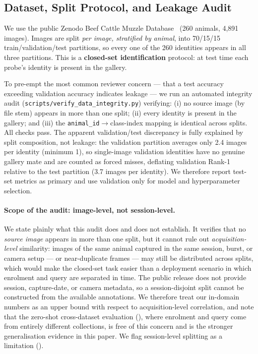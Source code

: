 \documentclass[11pt]{article}
\begin{document}
\subsection{Dataset, Split Protocol, and Leakage Audit}\label{sec:data}
We use the public Zenodo Beef Cattle Muzzle Database~\cite{zenodo} (260 animals, 4{,}891 images). Images
are split \emph{per image, stratified by animal}, into 70/15/15 train/validation/test
partitions, so every one of the 260 identities appears in all three partitions. This is a
\textbf{closed-set identification} protocol: at test time each probe's identity is present
in the gallery.

To pre-empt the most common reviewer concern --- that a test accuracy exceeding validation
accuracy indicates leakage --- we run an automated integrity audit
(\texttt{scripts/\allowbreak verify\_data\_integrity.py}) verifying: (i) no source image (by file stem)
appears in more than one split; (ii) every identity is present in the gallery; and (iii)
the \texttt{animal\_id}$\to$class-index mapping is identical across splits. All checks pass.
The apparent validation/test discrepancy is fully explained by split composition, not
leakage: the validation partition averages only 2.4 images per identity (minimum 1), so
single-image validation identities have no genuine gallery mate and are counted as forced
misses, deflating validation Rank-1 relative to the test partition (3.7 images per
identity). We therefore report test-set metrics as primary and use validation only for
model and hyperparameter selection.

\paragraph{Scope of the audit: image-level, not session-level.} We state plainly what this
audit does and does not establish. It verifies that no \emph{source image} appears in more
than one split, but it cannot rule out \emph{acquisition-level} similarity: images of the
same animal captured in the same session, burst, or camera setup --- or near-duplicate frames
--- may still be distributed across splits, which would make the closed-set task easier than
a deployment scenario in which enrolment and query are separated in time. The public release
does not provide session, capture-date, or camera metadata, so a session-disjoint split
cannot be constructed from the available annotations. We therefore treat our in-domain
numbers as an upper bound with respect to acquisition-level correlation, and note that the
zero-shot cross-dataset evaluation (), where enrolment and query come from
entirely different collections, is free of this concern and is the stronger generalisation
evidence in this paper. We flag session-level splitting as a limitation
().
\end{document}
